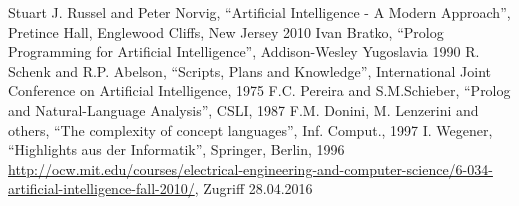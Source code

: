 \documentclass[fleqn]{article}
\numberwithin{equation}{section}
\numberwithin{figure}{section}
\numberwithin{table}{section}
\begin{document}
\begin{thebibliography}{999}
 Stuart J. Russel and Peter Norvig, “Artificial Intelligence - A Modern Approach”, Pretince Hall, Englewood Cliffs, New Jersey 2010
 Ivan Bratko, “Prolog Programming for Artificial Intelligence”, Addison-Wesley Yugoslavia 1990
 R. Schenk and R.P. Abelson, “Scripts, Plans and Knowledge”, International Joint Conference on Artificial Intelligence, 1975
 F.C. Pereira and S.M.Schieber, “Prolog and Natural-Language Analysis”, CSLI, 1987
 F.M. Donini, M. Lenzerini and others, “The complexity of concept languages”, Inf. Comput., 1997
 I. Wegener, “Highlights aus der Informatik”, Springer, Berlin, 1996
 \url{http://ocw.mit.edu/courses/electrical-engineering-and-computer-science/6-034-artificial-intelligence-fall-2010/}, Zugriff 28.04.2016
\end{thebibliography}
\end{document}
